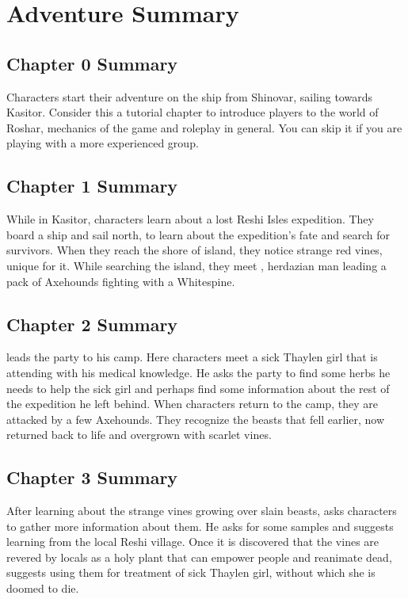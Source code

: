 \section{Adventure Summary}

\subsection{Chapter 0 Summary}

Characters start their adventure on the ship from Shinovar, sailing towards Kasitor. Consider this a tutorial chapter to introduce players to the world of Roshar, mechanics of the game and roleplay in general. You can skip it if you are playing with a more experienced group.

\subsection{Chapter 1 Summary}

While in Kasitor, characters learn about a lost Reshi Isles expedition. They board a ship and sail north, to learn about the expedition's fate and search for survivors. When they reach the shore of \theIsland{} island, they notice strange red vines, unique for it. While searching the island, they meet \npcMedic{}, herdazian man leading a pack of Axehounds fighting with a Whitespine.

\subsection{Chapter 2 Summary}

\npcMedic{} leads the party to his camp. Here characters meet a sick Thaylen girl that \npcMedic{} is attending with his medical knowledge. He asks the party to find some herbs he needs to help the sick girl and perhaps find some information about the rest of the expedition he left behind. When characters return to the camp, they are attacked by a few Axehounds. They recognize the beasts that fell earlier, now returned back to life and overgrown with scarlet vines.

\subsection{Chapter 3 Summary}

After learning about the strange vines growing over slain beasts, \npcMedic{} asks characters to gather more information about them. He asks for some samples and suggests learning from the local Reshi village. Once it is discovered that the vines are revered by locals as a holy plant that can empower people and reanimate dead, \npcMedic{} suggests using them for treatment of sick Thaylen girl, without which she is doomed to die.

